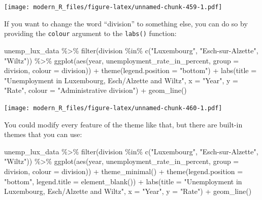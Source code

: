 \documentclass[
]{article}
\newenvironment{Shaded}{\begin{snugshade}}{\end{snugshade}}
\newcommand{\AttributeTok}[1]{\textcolor[rgb]{0.77,0.63,0.00}{#1}}
\newcommand{\FunctionTok}[1]{\textcolor[rgb]{0.00,0.00,0.00}{#1}}
\newcommand{\NormalTok}[1]{#1}
\newcommand{\SpecialCharTok}[1]{\textcolor[rgb]{0.00,0.00,0.00}{#1}}
\newcommand{\StringTok}[1]{\textcolor[rgb]{0.31,0.60,0.02}{#1}}
\begin{document}
\texttt{[image: modern\_R\_files/figure-latex/unnamed-chunk-459-1.pdf]}

If you want to change the word ``division'' to something else, you can do so by providing the \texttt{colour} argument
to the \texttt{labs()} function:

\begin{Shaded}
\begin{Highlighting}[]
\NormalTok{unemp\_lux\_data }\SpecialCharTok{\%\textgreater{}\%}
  \FunctionTok{filter}\NormalTok{(division }\SpecialCharTok{\%in\%} \FunctionTok{c}\NormalTok{(}\StringTok{"Luxembourg"}\NormalTok{, }\StringTok{"Esch{-}sur{-}Alzette"}\NormalTok{, }\StringTok{"Wiltz"}\NormalTok{)) }\SpecialCharTok{\%\textgreater{}\%}
  \FunctionTok{ggplot}\NormalTok{(}\FunctionTok{aes}\NormalTok{(year, unemployment\_rate\_in\_percent, }\AttributeTok{group =}\NormalTok{ division, }\AttributeTok{colour =}\NormalTok{ division)) }\SpecialCharTok{+}
  \FunctionTok{theme}\NormalTok{(}\AttributeTok{legend.position =} \StringTok{"bottom"}\NormalTok{) }\SpecialCharTok{+}
  \FunctionTok{labs}\NormalTok{(}\AttributeTok{title =} \StringTok{"Unemployment in Luxembourg, Esch/Alzette and Wiltz"}\NormalTok{, }\AttributeTok{x =} \StringTok{"Year"}\NormalTok{, }\AttributeTok{y =} \StringTok{"Rate"}\NormalTok{, }\AttributeTok{colour =} \StringTok{"Administrative division"}\NormalTok{) }\SpecialCharTok{+}
  \FunctionTok{geom\_line}\NormalTok{()}
\end{Highlighting}
\end{Shaded}

\texttt{[image: modern\_R\_files/figure-latex/unnamed-chunk-460-1.pdf]}

You could modify every feature of the theme like that, but there are built-in themes that you can use:

\begin{Shaded}
\begin{Highlighting}[]
\NormalTok{unemp\_lux\_data }\SpecialCharTok{\%\textgreater{}\%}
  \FunctionTok{filter}\NormalTok{(division }\SpecialCharTok{\%in\%} \FunctionTok{c}\NormalTok{(}\StringTok{"Luxembourg"}\NormalTok{, }\StringTok{"Esch{-}sur{-}Alzette"}\NormalTok{, }\StringTok{"Wiltz"}\NormalTok{)) }\SpecialCharTok{\%\textgreater{}\%}
  \FunctionTok{ggplot}\NormalTok{(}\FunctionTok{aes}\NormalTok{(year, unemployment\_rate\_in\_percent, }\AttributeTok{group =}\NormalTok{ division, }\AttributeTok{colour =}\NormalTok{ division)) }\SpecialCharTok{+}
  \FunctionTok{theme\_minimal}\NormalTok{() }\SpecialCharTok{+}
  \FunctionTok{theme}\NormalTok{(}\AttributeTok{legend.position =} \StringTok{"bottom"}\NormalTok{, }\AttributeTok{legend.title =} \FunctionTok{element\_blank}\NormalTok{()) }\SpecialCharTok{+}
  \FunctionTok{labs}\NormalTok{(}\AttributeTok{title =} \StringTok{"Unemployment in Luxembourg, Esch/Alzette and Wiltz"}\NormalTok{, }\AttributeTok{x =} \StringTok{"Year"}\NormalTok{, }\AttributeTok{y =} \StringTok{"Rate"}\NormalTok{) }\SpecialCharTok{+}
  \FunctionTok{geom\_line}\NormalTok{()}
\end{Highlighting}
\end{Shaded}
\end{document}
